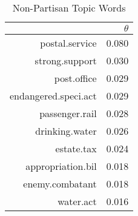 \begin{table}[ht]
\centering
\begin{tabular}{rr}
  \hline
 & $\theta$ \\ 
  \hline
postal.service & 0.080 \\ 
  strong.support & 0.030 \\ 
  post.office & 0.029 \\ 
  endangered.speci.act & 0.029 \\ 
  passenger.rail & 0.028 \\ 
  drinking.water & 0.026 \\ 
  estate.tax & 0.024 \\ 
  appropriation.bil & 0.018 \\ 
  enemy.combatant & 0.018 \\ 
  water.act & 0.016 \\ 
   \hline
\end{tabular}
\caption{Non-Partisan Topic Words} 
\label{tab:non_part_topics}
\end{table}
